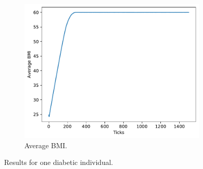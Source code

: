 \begin{figure}
\begin{subfigure}[b]{0.3\columnwidth}
            \includegraphics[width=1\columnwidth]{files/results-bmi.pdf}
            \caption{Average BMI.}
            \label{subfig:sol}
        \end{subfigure}
        \caption{Results for one diabetic individual.}
        \label{fig:res}
	\end{figure}
